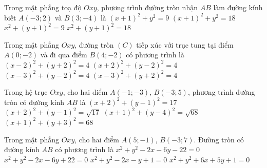 \begin{ex}%
	Trong mặt phẳng toạ độ $Oxy$, phương trình đường tròn nhận $AB$ làm đường kính biết $A(-3;2)$ và $B(3;-4)$ là 
	 \choice
		{$(x+1)^2+y^2=9$} 
		 {$(x+1)^2+y^2=18$}
		{$x^2+(y+1)^2=9$} 
		{\True $x^2+(y+1)^2=18$} 
\end{ex}

\begin{ex}%
	Trong mặt  phẳng $Oxy$, đường tròn $(C)$ tiếp xúc với trục tung tại điểm $A(0;-2)$ và đi qua điểm $B(4;-2)$ có phương trình là
	\choice 
		{\True $(x-2)^2+(y+2)^2=4$} 
		 {$(x+2)^2+(y-2)^2=4$}
		{$(x-3)^2+(y-2)^2=4$} 
		{$(x-3)^2+(y+2)^2=4$} 
\end{ex}

\begin{ex}%
	Trong hệ trục $Oxy$, cho hai điểm $A(-1;-3)$, $B(-3; 5)$, phương trình đường tròn có đường kính $AB$ là 
	 \choice
		{\True  $(x+2)^2+(y-1)^2=17$}
		 {$(x+2)^2+(y-1)^2=\sqrt{17}$}
		{$(x+1)^2+(y-4)^2=\sqrt{68}$} 
		 {$(x+1)^2+(y+3)^2=68$}
\end{ex}

\begin{ex}%
	Trong mặt phẳng $Oxy$, cho hai điểm  $A(5;-1)$, $B(-3;7)$. Đường tròn có đường kính $AB$ có phương trình là
	 \choice
		{\True $x^2+y^2-2x-6y-22=0$} 
		 {$x^2+y^2-2x-6y+22=0$}
		 {$x^2+y^2-2x-y+1=0$}
		 {$x^2+y^2+6x+5y+1=0$}
\end{ex}

